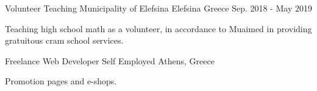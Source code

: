 \begin{cventries}


  \cventry
    {Volunteer Teaching} %
    {Municipality of Elefsina} %
    {Elefsina Greece} %
    {Sep. 2018 - May 2019} %
    {
      \begin{cvitems} %
        \item {Teaching high school math as a volunteer, in accordance to Muaimed in providing gratuitous cram school services.}
      \end{cvitems}
    }

\cventry
{Freelance Web Developer} %
{Self Employed} %
{Athens, Greece} %
{} %
{
	\begin{cvitems} %
		\item {Promotion pages and e-shops.}
	\end{cvitems}	
}

\end{cventries}
